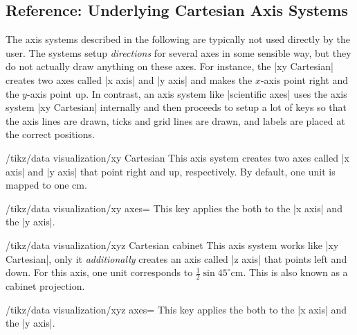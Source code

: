 \subsection{Reference: Underlying Cartesian Axis Systems}

The axis systems described in the following are typically not used
directly by the user. The systems setup \emph{directions} for several
axes in some sensible way, but they do not actually draw anything on
these axes. For instance, the |xy Cartesian| creates two axes called
|x axis| and |y axis| and makes the $x$-axis point right and the
$y$-axis point up. In contrast, an axis system like |scientific axes|
uses the axis system |xy Cartesian| internally and then proceeds to
setup a lot of keys so that the axis lines are drawn,
ticks and grid lines are drawn, and labels are placed at the correct
positions. 

\begin{key}{/tikz/data visualization/xy Cartesian}
  This axis system creates two axes called |x axis| and |y axis| that
  point right and up, respectively. By default, one unit is mapped to
  one cm.

\begin{codeexample}[]
\end{codeexample}
  
  
  \begin{key}{/tikz/data visualization/xy axes=}
    This key applies the  both to the |x axis| and the
    |y axis|. 
  \end{key}

\end{key}


\begin{key}{/tikz/data visualization/xyz Cartesian cabinet}
  This axis system works like |xy Cartesian|, only it
  \emph{additionally} creates an axis called |z axis| that points left
  and down. For this axis, one unit corresponds to $\frac{1}{2}\sin
  45^\circ\mathrm{cm}$. This is also known as a cabinet projection.
  
  \begin{key}{/tikz/data visualization/xyz axes=}
    This key applies the  both to the |x axis| and the
    |y axis|.   
  \end{key}

\end{key}


